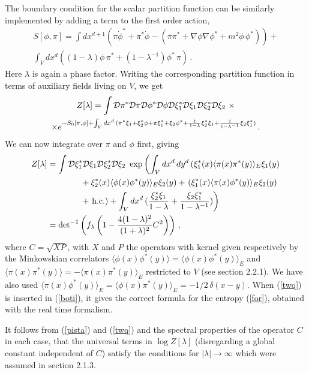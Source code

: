 \documentclass[11pt]{article}
\def\nn{\nonumber}
\begin{document}
The boundary condition for the scalar partition function can be similarly implemented by adding a term to the  first order action, 
\begin{multline}
S[\phi,\pi]=\int dx^{d+1} \left(\pi\dot{\phi}^*+\pi^*\dot{\phi}-\left(\pi \pi^*+\nabla\phi \nabla \phi^*+m^2 \phi \,\phi^*\right)\right)+\\
\int_V dx^d ((1-\lambda) \phi\, \pi^*+(1-\lambda^{-1}) \phi^*\, \pi)\,.
\end{multline}    
Here $\lambda$ is again a phase factor.    
Writing the corresponding partition function in terms of auxiliary fields living on $V$, we get
 \begin{multline}
 Z[\lambda]=\int {\cal D}\pi^*{\cal D}\pi{\cal D}\phi^*{\cal D}\phi{\cal D}\xi_1^* {\cal D}\xi_1{\cal D}\xi_2^* {\cal D}\xi_2\,\, \times \\
 \times e^{-S_0[\pi,\phi]+\int_V dx^d\, (\pi^* \xi_1 +\xi_2^* \phi +\pi \xi_1^* +\xi_2 \phi^* +\frac{1}{1-\lambda} \xi_2^* \xi_1+\frac{1}{1-\lambda^{-1}} \xi_2 \xi_1^*)}\,.
 \label{nio}\end{multline}
We can now integrate over $\pi$ and $\phi$ first, giving
\begin{align}
 Z[\lambda] & =\int {\cal D}\xi_1^* {\cal D}\xi_1{\cal D}\xi_2^* {\cal D}\xi_2\,\, \exp\left(\int_V dx^d \, dy^d\,( \xi_1^*(x)\langle\pi(x)\pi^*(y) \rangle_E \xi_1(y)\right. \nn\\
& \qquad\qquad +\xi_2^*(x)\langle\phi(x)\phi^*(y) \rangle_E \xi_2(y)  \label{twq} + \left.(\xi_1^*(x)\langle\pi(x)\phi^*(y)\rangle_E\xi_2(y) \right.\nn\\
& \qquad \qquad + \left.\textrm{h.c.})+\int_V dx^d \,(\frac{\xi_2^* \xi_1}{1-\lambda} +\frac{\xi_2 \xi_1^*}{1-\lambda^{-1}}) \right) \nn\\
 &= \textrm{det}^{-1}\left(f_\lambda\left(1- \frac{4(1-\lambda)^2}{(1+\lambda)^2}C^2\right)\right)\,,
\end{align}
where $C=\sqrt{XP}$, with $X$ and $P$ the operators with kernel given respectively by the Minkowskian correlators $\langle\phi(x)\phi^*(y) \rangle=\langle\phi(x)\phi^*(y) \rangle_E$ and $\langle\pi(x)\pi^*(y) \rangle=-\langle\pi(x)\pi^*(y) \rangle_E$ restricted to $V$ (see section 2.2.1). We have also used $\langle\pi(x) \phi^*(y) \rangle_E=\langle\phi(x) \pi^*(y) \rangle_E=-1/2 \,\delta(x-y)$. When (\ref{twq}) is inserted in (\ref{boti}), it gives the correct formula for the entropy (\ref{for}), obtained with the real time formalism.  

It follows from (\ref{pista}) and (\ref{twq}) and the spectral properties of the operator $C$ in each case, that the universal terms in $\log Z[\lambda]$ (disregarding a global constant independent of $C$) satisfy the conditions for $|\lambda|\rightarrow \infty$ which were assumed in section 2.1.3. 
\end{document}
